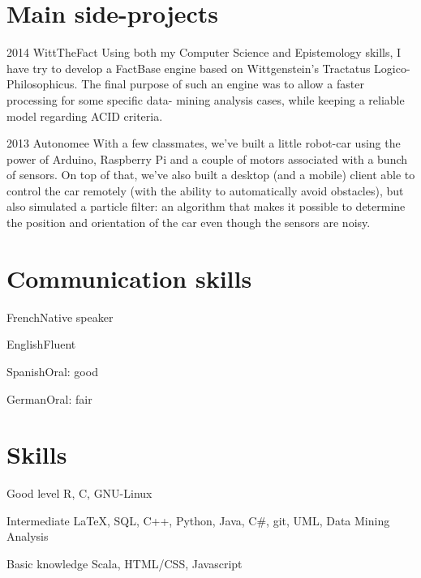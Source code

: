 \documentclass[fontsize=10pt]{tccv}
\begin{document}
\section{Main side-projects}

\begin{list}

\item{2014}
     {WittTheFact}
     {Using both my Computer Science and Epistemology skills, I have try to develop a
     FactBase engine based on Wittgenstein’s Tractatus Logico-Philosophicus.
     The final purpose of such an engine was to allow a faster processing for some specific data-
     mining analysis cases, while keeping a reliable model regarding ACID criteria.}

\item{2013}
     {Autonomee}
     {With a few classmates, we've built a little robot-car using the power of Arduino, Raspberry
     Pi and a couple of motors associated with a bunch of sensors. On top of that, we've also
     built a desktop (and a mobile) client able to control the car remotely (with the ability to
     automatically avoid obstacles), but also simulated a particle filter: an algorithm that makes it
     possible to determine the position and orientation of the car even though the sensors are
     noisy.}

\end{list}

\section{Communication skills}

\begin{factlist}
\item{French}{Native speaker}
\item{English}{Fluent}
\item{Spanish}{Oral: good}
\item{German}{Oral: fair}
\end{factlist}

\section{Skills}

\begin{factlist}

\item{Good level}
     {R, C, GNU-Linux}

\item{Intermediate}
     {\LaTeX, SQL, C++, Python, Java, C\#, git, UML, Data Mining Analysis}

\item{Basic knowledge}
     {Scala, HTML/CSS, Javascript}

\end{factlist}
\end{document}
